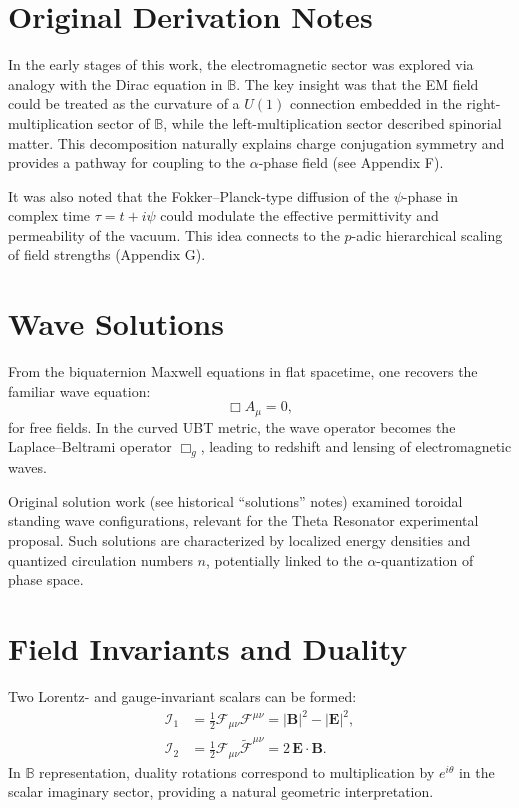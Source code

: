 \section{Original Derivation Notes}
In the early stages of this work, the electromagnetic sector was explored via analogy with the Dirac equation in $\mathbb{B}$. The key insight was that the EM field could be treated as the curvature of a $U(1)$ connection embedded in the right-multiplication sector of $\mathbb{B}$, while the left-multiplication sector described spinorial matter. This decomposition naturally explains charge conjugation symmetry and provides a pathway for coupling to the $\alpha$-phase field (see Appendix F).

It was also noted that the Fokker--Planck-type diffusion of the $\psi$-phase in complex time $\tau = t + i\psi$ could modulate the effective permittivity and permeability of the vacuum. This idea connects to the $p$-adic hierarchical scaling of field strengths (Appendix G).

\section{Wave Solutions}
From the biquaternion Maxwell equations in flat spacetime, one recovers the familiar wave equation:
\begin{equation}
    \Box A_\mu = 0,
\end{equation}
for free fields. In the curved UBT metric, the wave operator becomes the Laplace--Beltrami operator $\Box_g$, leading to redshift and lensing of electromagnetic waves.

Original solution work (see historical ``solutions'' notes) examined toroidal standing wave configurations, relevant for the Theta Resonator experimental proposal. Such solutions are characterized by localized energy densities and quantized circulation numbers $n$, potentially linked to the $\alpha$-quantization of phase space.

\section{Field Invariants and Duality}
Two Lorentz- and gauge-invariant scalars can be formed:
\begin{align}
    \mathcal{I}_1 &= \frac{1}{2} \mathcal{F}_{\mu\nu} \mathcal{F}^{\mu\nu} 
        = |\mathbf{B}|^2 - |\mathbf{E}|^2, \\
    \mathcal{I}_2 &= \frac{1}{2} \mathcal{F}_{\mu\nu} \tilde{\mathcal{F}}^{\mu\nu} 
        = 2\,\mathbf{E} \cdot \mathbf{B}.
\end{align}
In $\mathbb{B}$ representation, duality rotations correspond to multiplication by $e^{i\theta}$ in the scalar imaginary sector, providing a natural geometric interpretation.

